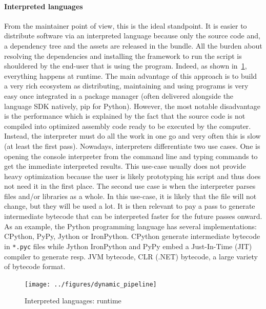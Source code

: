 \paragraph{Interpreted languages} From the maintainer point of view, this is the ideal standpoint. It is easier to
distribute software via an interpreted language because only the source code and, a dependency tree and the assets are
released in the bundle. All the burden about resolving the dependencies and installing the framework to run the script
is shouldered by the end-user that is using the program. Indeed, as shown in~\cref{fig:static.dynamic.dynamic.pipeline},
everything happens at runtime. The main advantage of this approach is to build a very rich ecosystem as distributing,
maintaining and using programs is very easy once integrated in a package manager (often delivered alongside the language
SDK natively, \eg pip for Python). However, the most notable disadvantage is the performance which is explained by the
fact that the source code is not compiled into optimized assembly code ready to be executed by the computer. Instead,
the interpreter must do all the work in one go and very often this is slow (at least the first pass). Nowadays,
interpreters differentiate two use cases. One is opening the console interpreter from the command line and typing
commands to get the immediate interpreted results. This use-case usually does not provide heavy optimization because the
user is likely prototyping his script and thus does not need it in the first place. The second use case is when the
interpreter parses files and/or libraries as a whole. In this use-case, it is likely that the file will not change, but
they will be used a lot. It is then relevant to pay a pass to generate intermediate bytecode that can be interpreted
faster for the future passes onward. As an example, the Python programming language has several implementations:
CPython, PyPy, Jython or IronPython. CPython generate intermediate bytecode in \texttt{*.pyc} files while Jython
IronPython and PyPy embed a Just-In-Time (JIT) compiler to generate resp. JVM bytecode, CLR (.NET) bytecode, a large
variety of bytecode format.

\begin{figure}[htbp]
  \centering
  \texttt{[image: ../figures/dynamic\_pipeline]}
  \caption{Interpreted languages: runtime}
  \label{fig:static.dynamic.dynamic.pipeline}
\end{figure}

